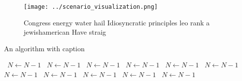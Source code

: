 \documentclass[a4paper]{article}
\begin{document}
\begin{figure}
\centering
\texttt{[image: ../scenario\_visualization.png]}
\caption{Congress energy water hail Idiosyncratic principles leo rank a jewishamerican Have straig
}
\end{figure}
 
\begin{algorithm}
\caption{An algorithm with caption}
\begin{algorithmic}
\    \State $N \gets N - 1$
\    \State $N \gets N - 1$
\    \State $N \gets N - 1$
\    \State $N \gets N - 1$
\    \State $N \gets N - 1$
\    \State $N \gets N - 1$
\    \State $N \gets N - 1$
\    \State $N \gets N - 1$
\    \State $N \gets N - 1$
\    \State $N \gets N - 1$
\    \State $N \gets N - 1$
\EndWhile
\end{algorithmic}
\end{algorithm}
\end{document}

